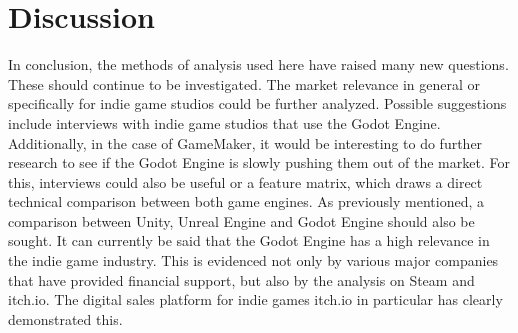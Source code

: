 \section{Discussion}
In conclusion, the methods of analysis used here have raised many new questions.
These should continue to be investigated.
The market relevance in general or specifically for indie game studios could be further analyzed.
Possible suggestions include interviews with indie game studios that use the Godot Engine.
Additionally, in the case of GameMaker, it would be interesting to do further research to see if the Godot Engine is slowly pushing them out of the market.
For this, interviews could also be useful or a feature matrix, which draws a direct technical comparison between both game engines.
As previously mentioned, a comparison between Unity, Unreal Engine and Godot Engine should also be sought.
It can currently be said that the Godot Engine has a high relevance in the indie game industry.
This is evidenced not only by various major companies that have provided financial support, but also by the analysis on Steam and itch.io. 
The digital sales platform for indie games itch.io in particular has clearly demonstrated this.
